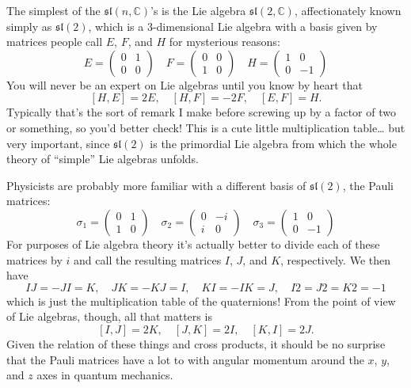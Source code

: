 \documentclass{article}
\begin{document}
The simplest of the \(\mathfrak{sl}(n,\mathbb{C})\)'s is the Lie algebra
\(\mathfrak{sl}(2,\mathbb{C})\), affectionately known simply as
\(\mathfrak{sl}(2)\), which is a 3-dimensional Lie algebra with a basis
given by matrices people call \(E\), \(F\), and \(H\) for mysterious
reasons:
\[E=\left(\begin{array}{cc}0&1\\0&0\end{array}\right) \quad F=\left(\begin{array}{cc}0&0\\1&0\end{array}\right) \quad H=\left(\begin{array}{cc}1&0\\0&-1\end{array}\right)\]
You will never be an expert on Lie algebras until you know by heart that
\[[H,E] = 2E, \quad [H,F] = -2F, \quad [E,F]  = H.\] Typically that's
the sort of remark I make before screwing up by a factor of two or
something, so you'd better check! This is a cute little multiplication
table\ldots{} but very important, since \(\mathfrak{sl}(2)\) is the
primordial Lie algebra from which the whole theory of ``simple'' Lie
algebras unfolds.

Physicists are probably more familiar with a different basis of
\(\mathfrak{sl}(2)\), the Pauli matrices:
\[\sigma_1=\left(\begin{array}{cc}0&1\\1&0\end{array}\right) \quad \sigma_2=\left(\begin{array}{cc}0&-i\\i&0\end{array}\right) \quad \sigma_3=\left(\begin{array}{cc}1&0\\0&-1\end{array}\right)\]
For purposes of Lie algebra theory it's actually better to divide each
of these matrices by \(i\) and call the resulting matrices \(I\), \(J\),
and \(K\), respectively. We then have
\[IJ = -JI = K, \quad JK = -KJ = I, \quad KI = -IK = J, \quad I2 = J2 = K2 = -1\]
which is just the multiplication table of the quaternions! From the
point of view of Lie algebras, though, all that matters is
\[[I,J] = 2K, \quad [J,K] = 2I, \quad [K,I] = 2J.\] Given the relation
of these things and cross products, it should be no surprise that the
Pauli matrices have a lot to with angular momentum around the \(x\),
\(y\), and \(z\) axes in quantum mechanics.
\end{document}
